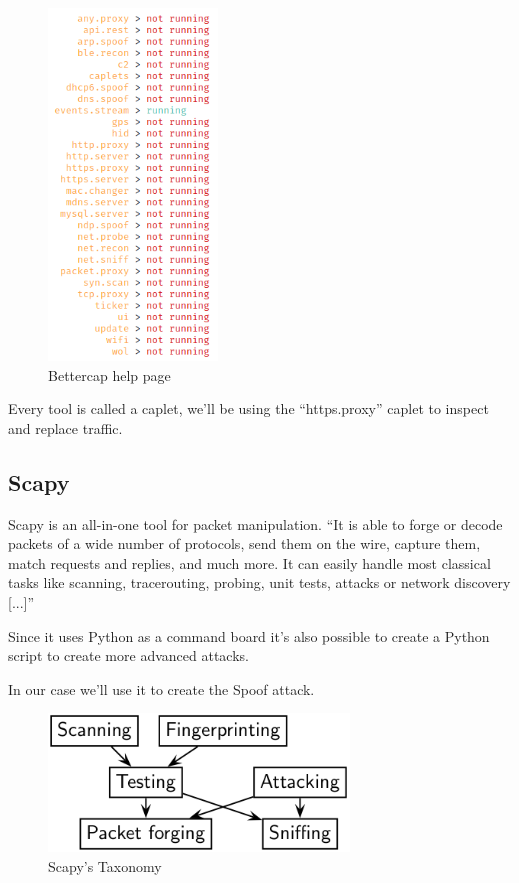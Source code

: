 \begin{figure}[h!]
 \centering
 \includegraphics[width=4.5cm]{img/bettercap_help.png}
 \caption{Bettercap help page}
 \label{fig: bettercap help}
\end{figure}

Every tool is called a caplet, we'll be using the ``https.proxy'' caplet to inspect and replace  traffic.

\newpage

\subsection{Scapy}

Scapy is an all-in-one tool for packet manipulation.
``It is able to forge or decode packets of a wide number of protocols, send them on the wire, capture them, match requests and replies, and much more. It can easily handle most classical tasks like scanning, tracerouting, probing, unit tests, attacks or network discovery [...]''\cite{scapy}

Since it uses Python as a command board it's also possible to create a Python script to create more advanced attacks.

In our case we'll use it to create the  Spoof attack.

\begin{figure}[h!]
 \centering
 \includegraphics[width=8cm]{img/testing-taxonomy.png}
 \caption{Scapy's Taxonomy}
 \label{fig: scapy taxonomy}
\end{figure}


